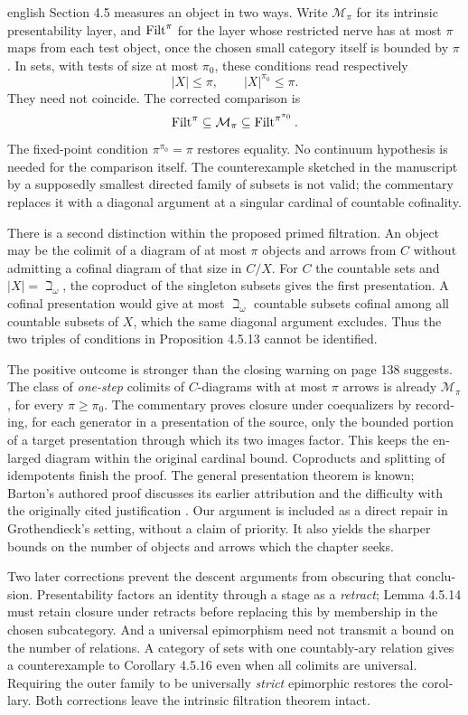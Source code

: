 \begin{otherlanguage}{english}
\begin{otherlanguage*}{english}
Section 4.5 measures an object in two ways. Write $\mathcal M_\pi$ for its intrinsic presentability layer, and $\operatorname{Filt}^\pi$ for the layer whose restricted nerve has at most $\pi$ maps from each test object, once the chosen small category itself is bounded by $\pi$. In sets, with tests of size at most $\pi_0$, these conditions read respectively
\[
 |X|\leq\pi,
 \qquad |X|^{\pi_0}\leq\pi.
\]
They need not coincide. The corrected comparison is
\[
 \operatorname{Filt}^\pi\subseteq\mathcal M_\pi
        \subseteq\operatorname{Filt}^{\pi^{\pi_0}}.
\]
The fixed-point condition $\pi^{\pi_0}=\pi$ restores equality. No continuum hypothesis is needed for the comparison itself. The counterexample sketched in the manuscript by a supposedly smallest directed family of subsets is not valid; the commentary replaces it with a diagonal argument at a singular cardinal of countable cofinality.

There is a second distinction within the proposed primed filtration. An object may be the colimit of a diagram of at most $\pi$ objects and arrows from $C$ without admitting a cofinal diagram of that size in $C/X$. For $C$ the countable sets and $|X|=\beth_\omega$, the coproduct of the singleton subsets gives the first presentation. A cofinal presentation would give at most $\beth_\omega$ countable subsets cofinal among all countable subsets of $X$, which the same diagonal argument excludes. Thus the two triples of conditions in Proposition 4.5.13 cannot be identified.

The positive outcome is stronger than the closing warning on page 138 suggests. The class of \emph{one-step} colimits of $C$-diagrams with at most $\pi$ arrows is already $\mathcal M_\pi$, for every $\pi\geq\pi_0$. The commentary proves closure under coequalizers by recording, for each generator in a presentation of the source, only the bounded portion of a target presentation through which its two images factor. This keeps the enlarged diagram within the original cardinal bound. Coproducts and splitting of idempotents finish the proof. The general presentation theorem is known; Barton's authored proof discusses its earlier attribution and the difficulty with the originally cited justification \citep{Barton2019Presentable}. Our argument is included as a direct repair in Grothendieck's setting, without a claim of priority. It also yields the sharper bounds on the number of objects and arrows which the chapter seeks.

Two later corrections prevent the descent arguments from obscuring that conclusion. Presentability factors an identity through a stage as a \emph{retract}; Lemma 4.5.14 must retain closure under retracts before replacing this by membership in the chosen subcategory. And a universal epimorphism need not transmit a bound on the number of relations. A category of sets with one countably-ary relation gives a counterexample to Corollary 4.5.16 even when all colimits are universal. Requiring the outer family to be universally \emph{strict} epimorphic restores the corollary. Both corrections leave the intrinsic filtration theorem intact.


\end{otherlanguage*}
\end{otherlanguage}
